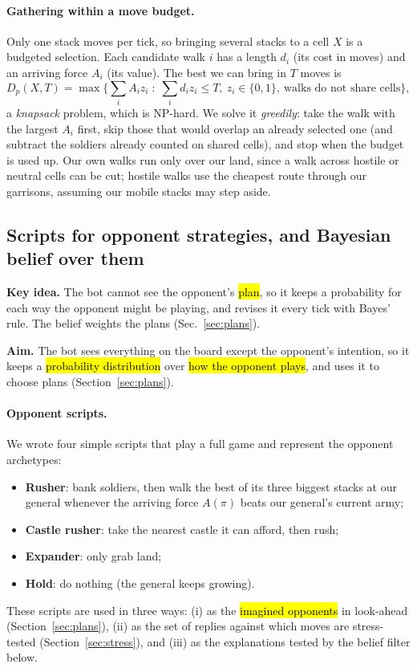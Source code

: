 \paragraph{Gathering within a move budget.} Only one stack moves per tick, so bringing several stacks to a
cell $X$ is a budgeted selection. Each candidate walk $i$ has a length $d_i$ (its cost in moves) and an
arriving force $A_i$ (its value). The best we can bring in $T$ moves is
\begin{equation}\label{eq:gather}
D_p(X,T)=\max\Big\{\sum_i A_i z_i \;:\; \sum_i d_i z_i\le T,\ z_i\in\{0,1\},\ \text{walks do not share cells}\Big\},
\end{equation}
a \emph{knapsack} problem, which is NP-hard. We solve it \emph{greedily}: take the walk with the largest $A_i$
first, skip those that would overlap an already selected one (and subtract the soldiers already counted on
shared cells), and stop when the budget is used up. Our own walks run only over our land, since a walk across
hostile or neutral cells can be cut; hostile walks use the cheapest route through our garrisons, assuming our
mobile stacks may step aside.

\subsection{Scripts for opponent strategies, and Bayesian belief over them}\label{sec:belief}

\begin{keyidea}
\textbf{Key idea.} The bot cannot see the opponent's \hl{plan}, so it keeps a probability for each way the
opponent might be playing, and revises it every tick with Bayes' rule. The belief weights the plans
(Sec.~\ref{sec:plans}).
\end{keyidea}

\textbf{Aim.} The bot sees everything on the board except the opponent's intention, so it keeps a
\hl{probability distribution} over \hl{how the opponent plays}, and uses it to choose plans
(Section~\ref{sec:plans}).

\paragraph{Opponent scripts.} We wrote four simple scripts that play a full game and represent the opponent
archetypes:
\begin{itemize}
\item \textbf{Rusher}: bank soldiers, then walk the best of its three biggest stacks at our general whenever
the arriving force $A(\pi)$ beats our general's current army;
\item \textbf{Castle rusher}: take the nearest castle it can afford, then rush;
\item \textbf{Expander}: only grab land;
\item \textbf{Hold}: do nothing (the general keeps growing).
\end{itemize}
These scripts are used in three ways: (i) as the \hl{imagined opponents} in look-ahead
(Section~\ref{sec:plans}), (ii) as the set of replies against which moves are stress-tested
(Section~\ref{sec:stress}), and (iii) as the explanations tested by the belief filter below.


